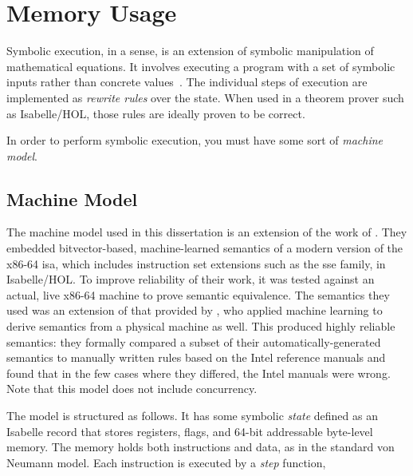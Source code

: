 \chapter{Memory Usage}\label{ch:symbolic_execution}



Symbolic execution, in a sense,%
is an extension of symbolic manipulation of mathematical equations.
It involves executing a program with a set of symbolic inputs
rather than concrete values~\citep{king1976symbolic}.
The individual steps of execution are implemented as \emph{rewrite rules}%
over the state.
When used in a theorem prover such as Isabelle/HOL,
those rules are ideally proven to be correct.

In order to perform symbolic execution, you must have some sort of \emph{machine model}.%

\section{Machine Model}\label{se:machine_model}
The machine model used in this dissertation%
is an extension of the work of \citet{roessle2019}.
They embedded bitvector-based, machine-learned semantics
of a modern version of the x86-64 \ac{isa},
which includes instruction set extensions such as the \ac{sse} family, in Isabelle/HOL.
To improve reliability of their work,
it was tested against an actual, live x86-64 machine to prove semantic equivalence.
The semantics they used was an extension of that
provided by \citet{heule2016stratified},
who applied machine learning to derive semantics from a physical machine as well.
This produced highly reliable semantics:
they formally compared a subset of their automatically-generated semantics
to manually written rules based on the Intel reference manuals
and found that in the few cases where they differed, the Intel manuals were wrong.
Note that this model does not include concurrency.

The model is structured as follows.
It has some symbolic \emph{state} defined as an Isabelle record
that stores registers, flags, and 64-bit addressable byte-level memory.
The memory holds both instructions and data, as in the standard von Neumann model.%
Each instruction is executed by a \emph{step} function,%




